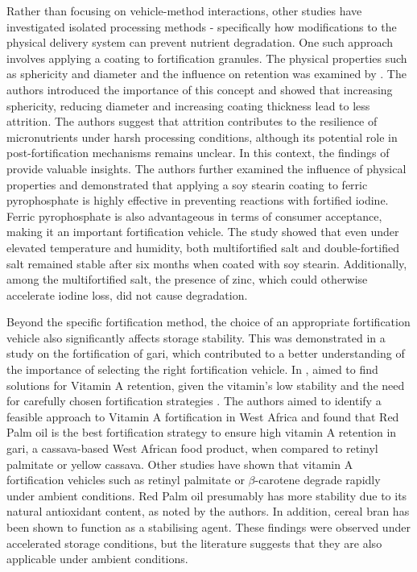 Rather than focusing on vehicle-method interactions, other studies have investigated isolated processing methods - specifically how modifications to the physical delivery system can prevent nutrient degradation. One such approach involves applying a coating to fortification granules. The physical properties such as sphericity and diameter and the influence on retention was examined by \citet{li2coatsalt}. The authors introduced the importance of this concept and showed that increasing sphericity, reducing diameter and increasing coating thickness lead to less attrition. The authors suggest that attrition contributes to the resilience of micronutrients under harsh processing conditions, although its potential role in post-fortification mechanisms remains unclear. In this context, the findings of \citet{li3capsalt} provide valuable insights. The authors further examined the influence of physical properties and demonstrated that applying a soy stearin coating to ferric pyrophosphate is highly effective in preventing reactions with fortified iodine. Ferric pyrophosphate is also advantageous in terms of consumer acceptance, making it an important fortification vehicle. The study showed that even under elevated temperature and humidity, both multifortified salt and double-fortified salt remained stable after six months when coated with soy stearin. Additionally,  among the multifortified salt,  the presence of zinc, which could otherwise accelerate iodine loss,  did not cause degradation.
\par
Beyond the specific fortification method, the choice of an appropriate fortification vehicle also significantly affects storage stability. This was demonstrated in a study on the fortification of gari, which contributed to a better understanding of the importance of selecting the right fortification vehicle. In \citeyear{gari}, \citeauthor{gari} aimed to find solutions for Vitamin A retention, given the vitamin’s low stability and the need for carefully chosen fortification strategies \autocite{vitaproblems}. The authors aimed to identify a feasible approach to Vitamin A fortification in West Africa and found that Red Palm oil is the best fortification strategy to ensure high vitamin A retention in gari, a cassava-based West African food product, when compared to retinyl palmitate or yellow cassava. Other studies have shown that vitamin A fortification vehicles such as retinyl palmitate or $\beta$-carotene degrade rapidly under ambient conditions. Red Palm oil presumably has more stability due to its natural antioxidant content, as noted by the authors. In addition, cereal bran has been shown to function as a stabilising agent. These findings were observed under accelerated storage conditions, but the literature suggests that they are also applicable under ambient conditions.
